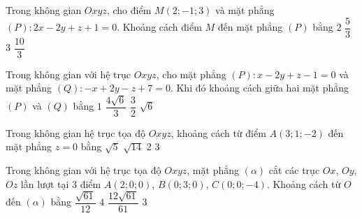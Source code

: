 \begin{ex}%
	Trong không gian $Oxyz$, cho điểm $M(2;-1;3)$ và mặt phẳng $(P)\colon 2x-2y+z+1=0$. Khoảng cách điểm $M$ đến mặt phẳng $(P)$ bằng 
	\choice 
		{$2$} 
		{$\dfrac{5}{3}$} 
		{$3$} 
		 {\True $\dfrac{10}{3}$}
\end{ex}

\begin{ex}%
	Trong không gian với hệ trục $Oxyz$, cho mặt phẳng $(P)\colon x - 2y + z - 1 = 0$ và mặt phẳng $(Q)\colon -x + 2y - z + 7 = 0$. Khi đó khoảng cách giữa hai mặt phẳng  $(P)$ và $(Q)$ bằng
	 \choice
		 {$1$}
		{$\dfrac{4\sqrt{6}}{3}$} 
		 {$\dfrac{3}{2}$}
		{\True $\sqrt{6}$} 
\end{ex}

\begin{ex}%
	Trong không gian hệ trục tọa độ $Oxyz$, khoảng cách từ điểm  $A(3;1;-2)$ đến mặt phẳng $z=0$ bằng
	 \choice
		{$\sqrt{5}$} 
		 {$\sqrt{14}$}
		 {\True $2$}
		{$3$} 
\end{ex}

\begin{ex}%
	Trong không gian với hệ trục tọa độ $Oxyz$, mặt phẳng $(\alpha)$ cắt các trục $Ox$, $Oy$, $Oz$ lần lượt  tại $3$ điểm $A(2;0;0)$, $B(0;3;0)$, $C(0;0;-4)$. Khoảng cách từ $O$ đến $(\alpha)$ bằng
	\choice 
		{$\dfrac{\sqrt{61}}{12}$} 
		 {$4$}
		{\True  $\dfrac{12\sqrt{61}}{61}$}
		 {$3$}
\end{ex}

